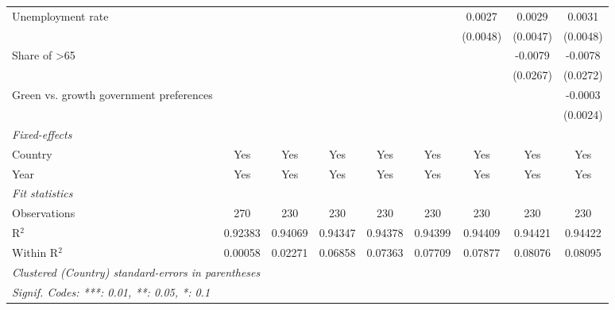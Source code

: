 \begin{table}[htbp]
\begin{tabular}{lcccccccc}
      Unemployment rate                       &          &          &                &                &                & 0.0027         & 0.0029         & 0.0031\\   
                                              &          &          &                &                &                & (0.0048)       & (0.0047)       & (0.0048)\\   
      Share of >65                            &          &          &                &                &                &                & -0.0079        & -0.0078\\   
                                              &          &          &                &                &                &                & (0.0267)       & (0.0272)\\   
      Green vs. growth government preferences &          &          &                &                &                &                &                & -0.0003\\   
                                              &          &          &                &                &                &                &                & (0.0024)\\   
      \midrule
      \emph{Fixed-effects}\\
      Country                                 & Yes      & Yes      & Yes            & Yes            & Yes            & Yes            & Yes            & Yes\\  
      Year                                    & Yes      & Yes      & Yes            & Yes            & Yes            & Yes            & Yes            & Yes\\  
      \midrule
      \emph{Fit statistics}\\
      Observations                            & 270      & 230      & 230            & 230            & 230            & 230            & 230            & 230\\  
      R$^2$                                   & 0.92383  & 0.94069  & 0.94347        & 0.94378        & 0.94399        & 0.94409        & 0.94421        & 0.94422\\  
      Within R$^2$                            & 0.00058  & 0.02271  & 0.06858        & 0.07363        & 0.07709        & 0.07877        & 0.08076        & 0.08095\\  
      \midrule \midrule
      \multicolumn{9}{l}{\emph{Clustered (Country) standard-errors in parentheses}}\\
      \multicolumn{9}{l}{\emph{Signif. Codes: ***: 0.01, **: 0.05, *: 0.1}}\\
   \end{tabular}
\end{table}


